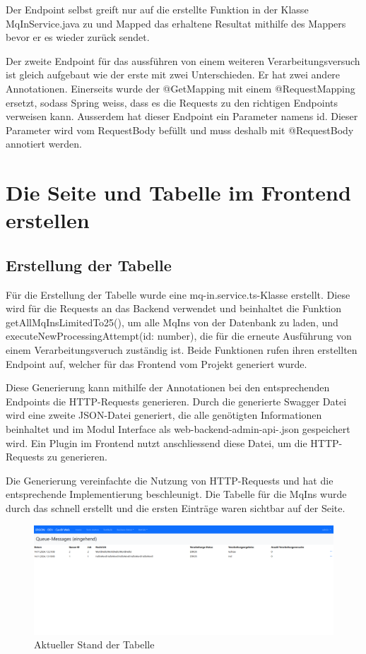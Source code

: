 \noindent Der Endpoint selbst greift nur auf die erstellte Funktion in der Klasse MqInService.java zu und Mapped das erhaltene Resultat mithilfe des Mappers bevor er es wieder zurück sendet.

Der zweite Endpoint für das aussführen von einem weiteren Verarbeitungsversuch ist gleich aufgebaut wie der erste mit zwei Unterschieden. Er hat zwei andere Annotationen. Einerseits wurde der @GetMapping mit einem @RequestMapping ersetzt, sodass Spring weiss, dass es die Requests zu den richtigen Endpoints verweisen kann. Ausserdem hat dieser Endpoint ein Parameter namens id. Dieser Parameter wird vom RequestBody befüllt und muss deshalb mit @RequestBody annotiert werden.

\section{Die Seite und Tabelle im Frontend erstellen}

\subsection{Erstellung der Tabelle}\label{ch:creation-of-table}
Für die Erstellung der Tabelle wurde eine mq-in.service.ts-Klasse erstellt. Diese wird für die Requests an das Backend verwendet und beinhaltet die Funktion getAllMqInsLimitedTo25(), um alle MqIns von der Datenbank zu laden, und executeNewProcessingAttempt(id: number), die für die erneute Ausführung von einem Verarbeitungsveruch zuständig ist. Beide Funktionen rufen ihren erstellten Endpoint auf, welcher für das Frontend vom Projekt generiert wurde.

Diese Generierung kann mithilfe der Annotationen bei den entsprechenden Endpoints die HTTP-Requests generieren. Durch die generierte Swagger Datei wird eine zweite JSON-Datei generiert, die alle genötigten Informationen beinhaltet und im Modul Interface als web-backend-admin-api-.json gespeichert wird. Ein Plugin im Frontend nutzt anschliessend diese Datei, um die HTTP-Requests zu generieren.

Die Generierung vereinfachte die Nutzung von HTTP-Requests und hat die entsprechende Implementierung beschleunigt. Die Tabelle für die MqIns wurde durch das schnell erstellt und die ersten Einträge waren sichtbar auf der Seite.

\begin{figure}[H]
	\begin{center}
		\includegraphics[width=1\textwidth]{ressourcen/4.2_Tabelle}
		\caption[Aktueller Stand der Tabelle]{Aktueller Stand der Tabelle}\label{fig:4.2-tabelle}
	\end{center}
\end{figure}

